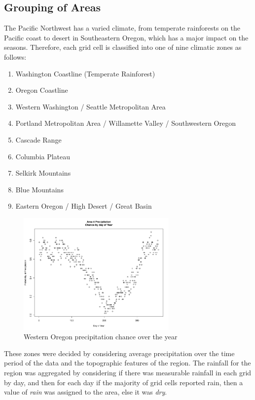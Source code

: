 \documentclass{article}
\begin{document}
\subsection{Grouping of Areas} \label{GroupArea}
The Pacific Northwest has a varied climate, from temperate rainforests on the Pacific coast to desert in Southeastern Oregon, which has a major impact on the seasons. Therefore, each grid cell is classified into one of nine climatic zones as follows:
\begin{enumerate}
\item Washington Coastline (Temperate Rainforest)
\item Oregon Coastline
\item Western Washington / Seattle Metropolitan Area
\item Portland Metropolitan Area / Willamette Valley / Southwestern Oregon
\item Cascade Range
\item Columbia Plateau
\item Selkirk Mountains
\item Blue Mountains
\item Eastern Oregon / High Desert / Great Basin
\end{enumerate}
\begin{figure}[h!]
\centering
\includegraphics[width = .4\textwidth, height = 6cm]{Area4PrecipByDay}
\caption{Western Oregon precipitation chance over the year}
\label{fig:area4}
\end{figure}
These zones were decided by considering average precipitation over the time period of the data and the topographic features of the region. The rainfall for the region was aggregated by considering if there was measurable rainfall in each grid by day, and then for each day if the majority of grid cells reported rain, then a value of \textit{rain} was assigned to the area, else it was \textit{dry}.
\end{document}
